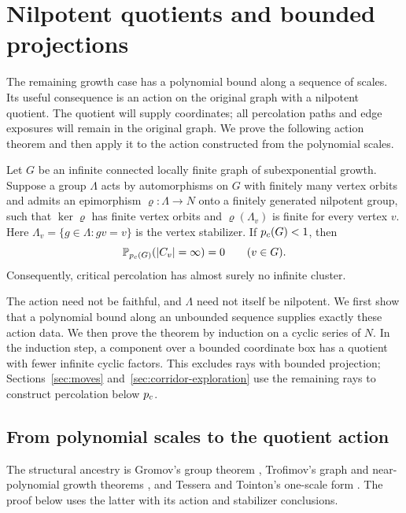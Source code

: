 \section{Nilpotent quotients and bounded projections}
\label{sec:structure}

The remaining growth case has a polynomial bound along a sequence of
scales. Its useful consequence is an action on the original graph with
a nilpotent quotient. The quotient will supply coordinates; all
percolation paths and edge exposures will remain in the original graph.
We prove the following action theorem and then apply it to the action
constructed from the polynomial scales.

\begin{theorem}
\label{thm:structured}
Let $G$ be an infinite connected locally finite graph of subexponential
growth. Suppose a group $\Lambda$ acts by automorphisms on $G$ with
finitely many vertex orbits and admits an epimorphism $\varrho:\Lambda\to N$ onto a
finitely generated nilpotent group, such that $\ker\varrho$ has finite
vertex orbits and $\varrho(\Lambda_v)$ is finite for every vertex $v$.
Here $\Lambda_v=\{g\in\Lambda:gv=v\}$ is the vertex stabilizer.
If $p_c(G)<1$, then
\[
 \mathbb P_{p_c(G)}(|C_v|=\infty)=0\qquad(v\in G).
\]
Consequently, critical percolation has almost surely no infinite cluster.
\end{theorem}

The action need not be faithful, and \(\Lambda\) need not itself be
nilpotent. We first show that a polynomial bound along an unbounded
sequence supplies exactly these action data. We then prove the theorem
by induction on a cyclic series of \(N\). In the induction step, a
component over a bounded coordinate box has a quotient with fewer
infinite cyclic factors. This excludes rays with bounded projection;
Sections~\ref{sec:moves} and~\ref{sec:corridor-exploration} use the
remaining rays to construct percolation below \(p_c\).

\subsection{From polynomial scales to the quotient action}

The structural ancestry is Gromov's group theorem \cite{Gromov1981},
Trofimov's graph and near-polynomial growth theorems
\cite{Trofimov1985,Trofimov2003}, and Tessera and Tointon's one-scale
form \cite{TesseraTointon2021}. The proof below uses the latter with
its action and stabilizer conclusions.


